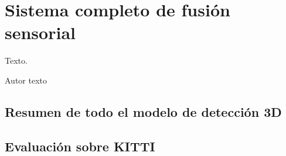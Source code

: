 \chapter{Sistema completo de fusión sensorial}
\label{cha:Sistema completo de fusión sensorial}

\begin{FraseCelebre}
  \begin{Frase}
    Texto.
  \end{Frase}
  \begin{Fuente}
    Autor texto
  \end{Fuente}
\end{FraseCelebre}

\section{Resumen de todo el modelo de detección 3D}
\label{sec:Resumen de todo el modelo de detección 3D}

\section{Evaluación sobre KITTI}
\label{sec:Evaluación sobre KITTI}
